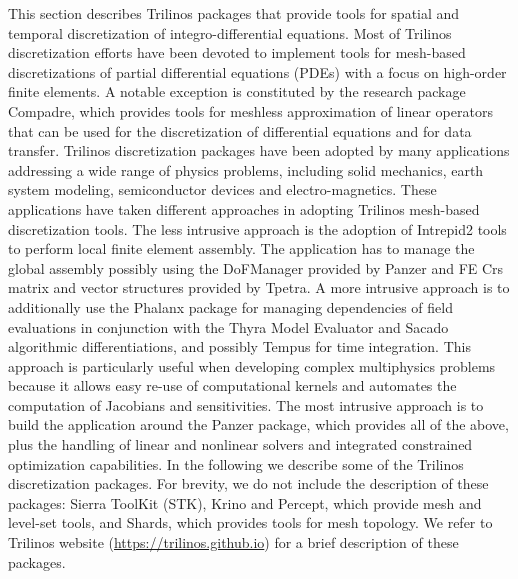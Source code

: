 
This section describes Trilinos packages that provide tools for spatial and temporal discretization of integro-differential equations. Most of Trilinos discretization efforts have been devoted to implement tools for mesh-based discretizations of partial differential equations (PDEs) with a focus on high-order finite elements. A notable exception is constituted by the research package Compadre, which provides tools for meshless approximation of linear operators that can be used for the discretization of differential equations and for data transfer.
Trilinos discretization packages have been adopted by many applications addressing a wide range of physics problems, including solid mechanics, earth system modeling, semiconductor devices and electro-magnetics. These applications have taken different approaches in adopting Trilinos mesh-based discretization tools. The less intrusive approach is the adoption of Intrepid2 tools to perform local finite element assembly. The application has to manage the global assembly possibly using the DoFManager provided by Panzer and FE Crs matrix and vector structures provided by Tpetra.  
A more intrusive approach is to additionally use the Phalanx package for managing dependencies of field evaluations in conjunction with the Thyra Model Evaluator and Sacado algorithmic differentiations, and possibly Tempus for time integration. This approach is particularly useful when developing complex multiphysics problems because it allows easy re-use of computational kernels and automates the computation of Jacobians and sensitivities.
The most intrusive approach is to build the application around the Panzer package, which provides all of the above, plus the handling of linear and nonlinear solvers and integrated constrained optimization capabilities.
In the following we describe some of the Trilinos discretization packages. For brevity, we do not include the description of these packages: Sierra ToolKit (STK), Krino and Percept, which provide mesh and level-set tools, and Shards, which provides tools for mesh topology. We refer to Trilinos website (\url{https://trilinos.github.io}) for a brief description of these packages.


